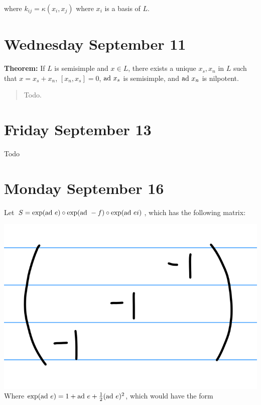 where \(k_{ij} = \kappa(x_i, x_j)\) where \(x_i\) is a basis of \(L\).

\hypertarget{wednesday-september-11}{%
\section{Wednesday September 11}\label{wednesday-september-11}}

\textbf{Theorem:} If \(L\) is semisimple and \(x\in L\), there exists a
unique \(x_s, x_n\) in \(L\) such that \(x = x_s + x_n\),
\([x_n, x_s] = 0\), \(\mathrm{ad}~ x_s\) is semisimple, and \(\mathrm{ad}~ x_n\) is
nilpotent.

\begin{quote}
Todo.
\end{quote}

\hypertarget{friday-september-13}{%
\section{Friday September 13}\label{friday-september-13}}

Todo

\hypertarget{monday-september-16}{%
\section{Monday September 16}\label{monday-september-16}}

Let \(S = \exp(\mathrm{ad}~ e) \circ \exp(\mathrm{ad}~ -f) \circ \exp(\mathrm{ad}~ ei)\), which has
the following matrix:

\includegraphics{figures/2019-09-16-09:13.png}\\

Where \(\exp(\mathrm{ad}~ e) = 1 + \mathrm{ad}~ e + \frac 1 2 (\mathrm{ad}~ e)^2\), which would
have the form

